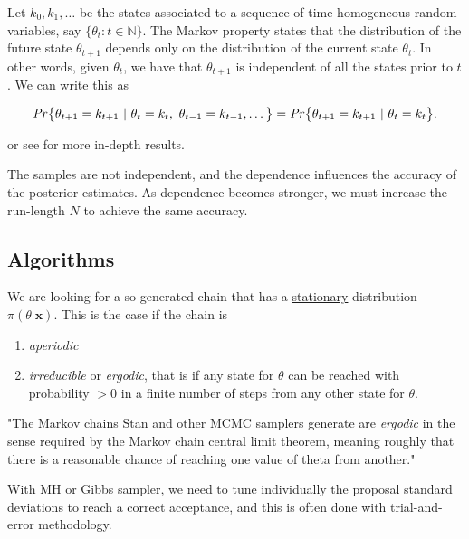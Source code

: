 \begin{definition}
	Let $k_0,k_1,\dots$ be the states associated to a sequence of time-homogeneous random variables, say $\big\{\theta_t:t\in\mathbb{N}\big\}$.
	The Markov property states that the distribution of the future state $\theta_{t+1}$ depends only on the distribution of the current state $\theta_{t}$. 
	In other words, given $\theta_{t}$, we have that $\theta_{t+1}$ is independent of all the states prior to $t$. We can write this as
	
	\begin{equation}
	\text{\emph{Pr}}\big\{\theta_{t+1}=k_{t+1}\ |\ \theta_t=k_t,\ \theta_{t-1}=k_{t-1},\dots\big\} = \text{\emph{Pr}}\big\{\theta_{t+1}=k_{t+1}\ | \ \theta_t=k_t\big\}.
	\end{equation}
\end{definition} 

or see \citet[section 2.2.3]{angelino_patterns_2016} for more in-depth results.

The samples are not independent, and the dependence influences the accuracy of the posterior estimates. As dependence becomes stronger, we must increase the run-length $N$ to achieve the same accuracy. 


\subsection{Algorithms} 

We are looking for a so-generated chain that has a \underline{stationary} distribution $\pi(\theta|\boldsymbol{x})$. This is the case if the chain is 

\begin{enumerate}
	\item \emph{aperiodic}
	\item \emph{irreducible} or \emph{ergodic}, that is if any state for $\theta$ can be reached with probability $>0$ in a finite number of steps from any other state for $\theta$.
\end{enumerate}

"The Markov chains Stan and other MCMC samplers generate are \emph{ergodic} in the
sense required by the Markov chain central limit theorem, meaning roughly that there
is a reasonable chance of reaching one value of theta from another." \cite{stan_stan_2016}

With MH or Gibbs sampler, we need to tune individually the proposal standard deviations to reach a correct acceptance, and this is often done with trial-and-error methodology. 



